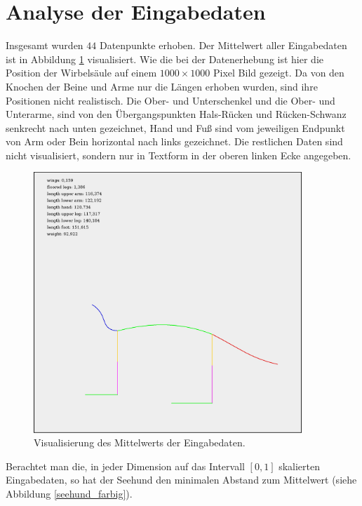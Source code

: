  \section{Analyse der Eingabedaten}
 
 Insgesamt wurden $44$ Datenpunkte erhoben. Der Mittelwert aller Eingabedaten ist in Abbildung \ref{mean_log_weight} visualisiert. Wie die bei der Datenerhebung ist hier die Position der Wirbelsäule auf einem $1000 \times 1000$ Pixel Bild gezeigt. Da von den Knochen der Beine und Arme nur die Längen erhoben wurden, sind ihre Positionen nicht realistisch. Die Ober- und Unterschenkel und die Ober- und Unterarme, sind von den Übergangspunkten Hals-Rücken und Rücken-Schwanz senkrecht nach unten gezeichnet, Hand und Fuß sind vom jeweiligen Endpunkt von Arm oder Bein horizontal nach links gezeichnet. Die restlichen Daten sind nicht visualisiert, sondern nur in Textform in der oberen linken Ecke angegeben.
 
 \begin{figure}
  \centering
  \includegraphics[width=0.9\textwidth]{../PCA/mean_log_weight.jpg}
  \caption{Visualisierung des Mittelwerts der Eingabedaten.}
  \label{mean_log_weight}
 \end{figure}
 
 Berachtet man die, in jeder Dimension auf das Intervall $[0, 1]$ skalierten Eingabedaten, so hat der Seehund den minimalen Abstand zum Mittelwert (siehe Abbildung \ref{seehund_farbig}).
 
